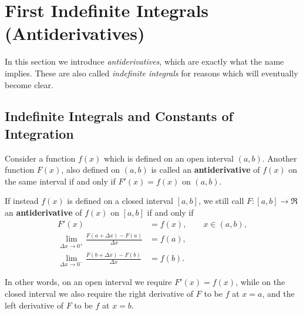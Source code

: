\newpage
\section{First Indefinite 
Integrals (Antiderivatives)\label{IndefiniteIntegrals}}
In this section we introduce {\it antiderivatives}, which are 
exactly what the name implies.  These are also called
{\it indefinite integrals} for reasons which will eventually
become clear.
\subsection{Indefinite Integrals and Constants of Integration}

\begin{definition}Consider a function $f(x)$ which is defined on an open
interval $(a,b)$.  Another function $F(x)$, also defined
on $(a,b)$ is called an {\bf antiderivative} of $f(x)$ on
the same interval if and only if $F'(x)=f(x)$ on $(a,b)$.

If instead $f(x)$ is defined on a closed interval $[a,b]$, we still call
$F:[a,b]\longrightarrow\Re$ an {\bf antiderivative} of $f(x)$
on $[a,b]$ if and only if 
\begin{align*}
F'(x)&=f(x),\qquad x\in(a,b),\\
\lim_{\Delta x\to0^+}\frac{F(a+\Delta x)-F(a)}{\Delta x}&=f(a),\\
\lim_{\Delta x\to0^-}\frac{F(b+\Delta x)-F(b)}{\Delta x}&=f(b).
\end{align*}
\end{definition}
In other words, on an open interval we require $F'(x)=f(x)$,
while on the closed interval we also require the right derivative
of $F$ to be $f$ at $x=a$, and the left derivative of $F$ to be 
$f$ at $x=b$.

